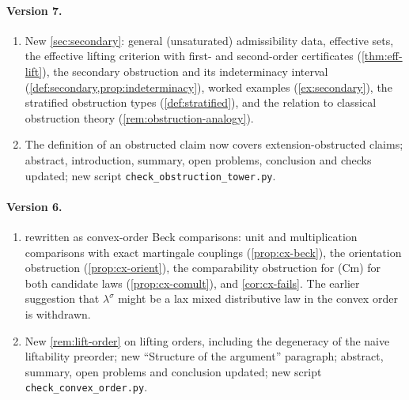 \documentclass[11pt]{article}
\theoremstyle{definition}
\theoremstyle{remark}
\newcommand{\ls}{\lambda^{\sigma}}
\begin{document}
\paragraph{Version 7.}
\begin{enumerate}[leftmargin=*,label=(\alph*)]
\item New \cref{sec:secondary}: general (unsaturated) admissibility data, effective sets, the effective
  lifting criterion with first- and second-order certificates (\cref{thm:eff-lift}), the secondary
  obstruction and its indeterminacy interval (\cref{def:secondary,prop:indeterminacy}), worked examples
  (\cref{ex:secondary}), the stratified obstruction types (\cref{def:stratified}), and the relation to
  classical obstruction theory (\cref{rem:obstruction-analogy}).
\item The definition of an obstructed claim now covers extension-obstructed claims; abstract,
  introduction, summary, open problems, conclusion and checks updated; new script
  \texttt{check\_obstruction\allowbreak\_tower.py}.
\end{enumerate}

\paragraph{Version 6.}
\begin{enumerate}[leftmargin=*,label=(\alph*)]
\item {} rewritten as convex-order Beck comparisons: unit and multiplication comparisons
  with exact martingale couplings (\cref{prop:cx-beck}), the orientation obstruction
  (\cref{prop:cx-orient}), the comparability obstruction for (Cm) for both candidate laws
  (\cref{prop:cx-comult}), and \cref{cor:cx-fails}. The earlier suggestion that $\ls$ might be a lax
  mixed distributive law in the convex order is withdrawn.
\item New \cref{rem:lift-order} on lifting orders, including the degeneracy of the naive liftability
  preorder; new ``Structure of the argument'' paragraph; abstract, summary, open problems and
  conclusion updated; new script \texttt{check\_convex\_order.py}.
\end{enumerate}
\end{document}

